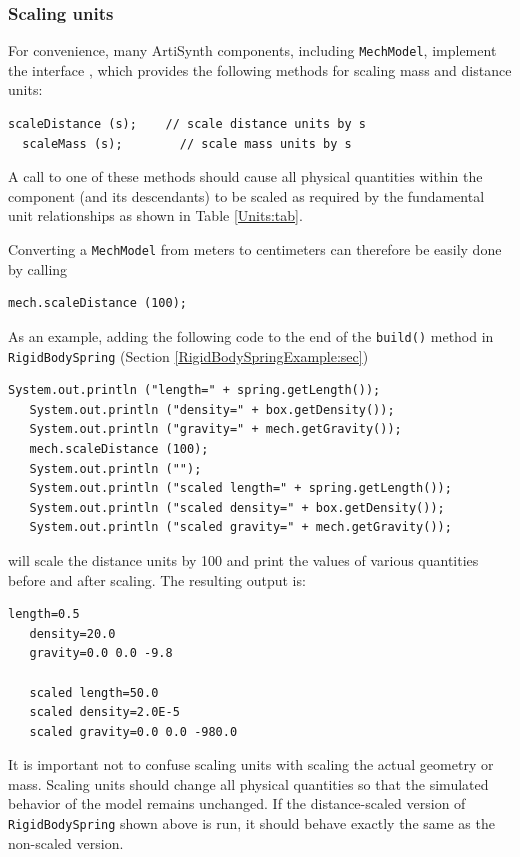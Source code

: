 \subsubsection{Scaling units}

For convenience, many ArtiSynth components, including {\tt MechModel},
implement the interface
, which
provides the following methods for scaling mass and distance units:
%
\begin{lstlisting}[]
  scaleDistance (s);    // scale distance units by s
  scaleMass (s);        // scale mass units by s
\end{lstlisting}
%
A call to one of these methods should cause all physical quantities
within the component (and its descendants) to be
scaled as required by the fundamental unit relationships
as shown in Table \ref{Units:tab}.

Converting a {\tt MechModel} from meters to centimeters can therefore be
easily done by calling 
%
\begin{lstlisting}[]
   mech.scaleDistance (100);
\end{lstlisting}
%
As an example, adding the following code to the end of the {\tt build()}
method in {\tt RigidBodySpring} (Section \ref{RigidBodySpringExample:sec})
%
\begin{lstlisting}[]
   System.out.println ("length=" + spring.getLength());
   System.out.println ("density=" + box.getDensity());
   System.out.println ("gravity=" + mech.getGravity());
   mech.scaleDistance (100);
   System.out.println ("");
   System.out.println ("scaled length=" + spring.getLength());
   System.out.println ("scaled density=" + box.getDensity());
   System.out.println ("scaled gravity=" + mech.getGravity());
\end{lstlisting}
%
will scale the distance units by 100 and print the values of various
quantities before and after scaling. The resulting output is:
%
\begin{lstlisting}[]
   length=0.5
   density=20.0
   gravity=0.0 0.0 -9.8

   scaled length=50.0
   scaled density=2.0E-5
   scaled gravity=0.0 0.0 -980.0
\end{lstlisting}
%

\begin{sideblock}
It is important not to confuse scaling units with scaling the actual
geometry or mass. Scaling units should change all physical
quantities so that the simulated behavior of the model remains
unchanged.  If the distance-scaled version of {\tt RigidBodySpring}
shown above is run, it should behave exactly the same as the
non-scaled version.
\end{sideblock}

